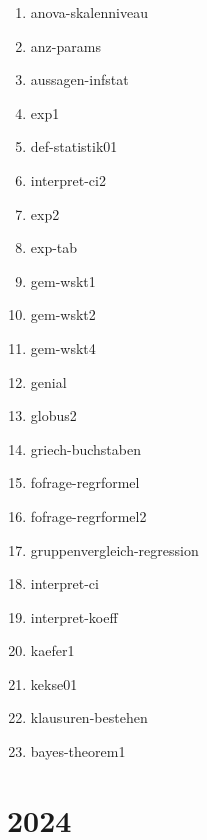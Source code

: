\documentclass[
  ngerman,
  letterpaper,
  twoside,
  open=any]{scrbook}
\providecommand{\tightlist}{%
  \setlength{\itemsep}{0pt}\setlength{\parskip}{0pt}}\usepackage{longtable,booktabs,array}
\theoremstyle{definition}
\theoremstyle{plain}
\theoremstyle{definition}
\theoremstyle{definition}
\theoremstyle{definition}
\theoremstyle{definition}
\theoremstyle{remark}
\begin{document}
\begin{enumerate}
\def\labelenumi{\arabic{enumi}.}
\tightlist
\item
  anova-skalenniveau
\item
  anz-params
\item
  aussagen-infstat
\item
  exp1
\item
  def-statistik01
\item
  interpret-ci2
\item
  exp2
\item
  exp-tab
\item
  gem-wskt1
\item
  gem-wskt2
\item
  gem-wskt4
\item
  genial
\item
  globus2
\item
  griech-buchstaben
\item
  fofrage-regrformel
\item
  fofrage-regrformel2
\item
  gruppenvergleich-regression
\item
  interpret-ci
\item
  interpret-koeff
\item
  kaefer1
\item
  kekse01
\item
  klausuren-bestehen
\item
  bayes-theorem1
\end{enumerate}

\section{2024}\label{section-17}
\end{document}
